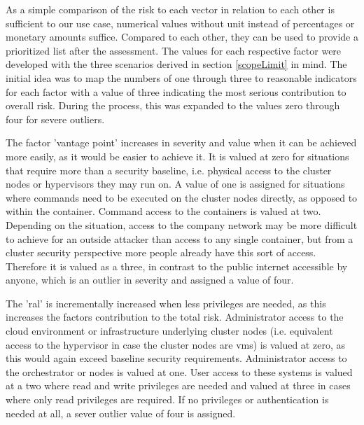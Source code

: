 As a simple comparison of the risk to each vector in relation to each other is sufficient to our use case, numerical values without unit instead of percentages or monetary amounts suffice. Compared to each other, they can be used to provide a prioritized list after the assessment.
The values for each respective factor were developed with the three scenarios derived in section \ref{scopeLimit} in mind. 
The initial idea was to map the numbers of one through three to reasonable indicators for each factor with a value of three indicating the most serious contribution to overall risk. During the process, this was expanded to the values zero through four for severe outliers.

The factor 'vantage point' increases in severity and value when it can be achieved more easily, as it would be easier to achieve it. It is valued at zero for situations that require more than a security baseline, i.e. physical access to the cluster nodes or hypervisors they may run on. A value of one is assigned for situations where commands need to be executed on the cluster nodes directly, as opposed to within the container. Command access to the containers is valued at two. Depending on the situation, access to the company network may be more difficult to achieve for an outside attacker than access to any single container, but from a cluster security perspective more people already have this sort of access. Therefore it is valued as a three, in contrast to the public internet accessible by anyone, which is an outlier in severity and assigned a value of four.

The '\gls{ral}' is incrementally increased when less privileges are needed, as this increases the factors contribution to the total risk.
Administrator access to the cloud environment or infrastructure underlying cluster nodes (i.e. equivalent access to the hypervisor in case the cluster nodes are \gls{vm}s) is valued at zero, as this would again exceed baseline security requirements. Administrator access to the orchestrator or nodes is valued at one. User access to these systems is valued at a two where read and write privileges are needed and valued at three in cases where only read privileges are required. If no privileges or authentication is needed at all, a sever outlier value of four is assigned.

